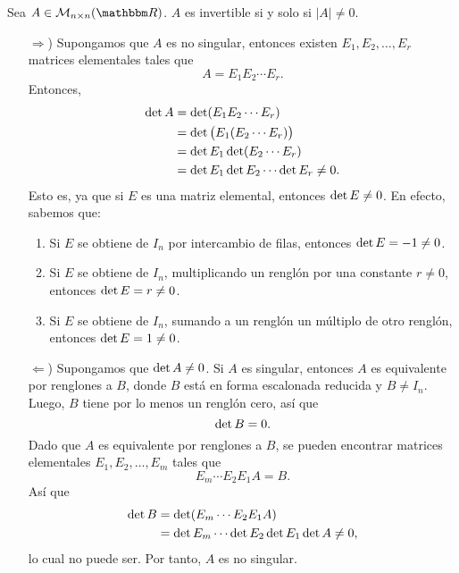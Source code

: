 \newpage

\begin{theorem}\label{singular_determinante}
    Sea $A \in \mathcal{M}_{n \times n}(\RR)$. $A$ es invertible si y solo si $|A| \neq 0$. \\
    \demostracion
    \begin{enumerate}
        \item[$\bm{\Rightarrow}$)] Supongamos que $A$ es no singular, entonces existen $E_1, E_2, \dots, E_r$ matrices elementales tales que
        $$A=E_1 E_2 \cdots E_r.$$
        Entonces,
        \begin{align*}
            \operatorname{det} A & = \operatorname{det} (E_1 E_2 \cdots E_r) \\
            & = \operatorname{det} \big(E_1 (E_2 \cdots E_r) \big) \\
            & = \operatorname{det} E_1 \operatorname{det} (E_2 \cdots E_r) \\
            & = \operatorname{det} E_1 \operatorname{det} E_2 \cdots \operatorname{det} E_r \neq 0.
        \end{align*}
        Esto es, ya que si $E$ es una matriz elemental, entonces $\operatorname{det} E \neq 0$. En efecto, sabemos que:
        \begin{enumerate}[label=\roman*)]
            \item Si $E$ se obtiene de $I_n$ por intercambio de filas, entonces $\operatorname{det} E =-1 \neq 0$.
            \item Si $E$ se obtiene de $I_n$, multiplicando un renglón por una constante $r \neq 0$, entonces $\operatorname{det} E=r \neq 0$.
            \item Si $E$ se obtiene de $I_n$, sumando a un renglón un múltiplo de otro renglón, entonces $\operatorname{det} E=1 \neq 0$.
        \end{enumerate}
        \item[$\bm{\Leftarrow}$)] Supongamos que $\operatorname{det} A \neq 0$. Si $A$ es singular, entonces $A$ es equivalente por renglones a $B$, donde $B$ está en forma escalonada reducida y $B \neq I_n$. Luego, $B$ tiene por lo menos un renglón cero, así que
        $$\operatorname{det} B=0.$$
        Dado que $A$ es equivalente por renglones a $B$, se pueden encontrar matrices elementales $E_1, E_2, \dots, E_m$ tales que
        $$E_m \cdots E_2 E_1 A = B.$$
        Así que
        \begin{align*}
            \operatorname{det} B & = \operatorname{det} (E_m \cdots E_2 E_1 A) \\
            & = \operatorname{det} E_m \cdots \operatorname{det} E_2 \operatorname{det} E_1 \operatorname{det} A \neq 0,
        \end{align*}
        lo cual no puede ser. Por tanto, $A$ es no singular.
    \end{enumerate}
\end{theorem}

